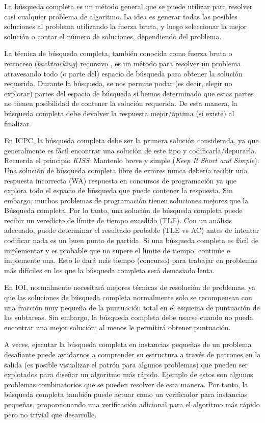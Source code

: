 La búsqueda completa es un método general que se puede utilizar para resolver casi cualquier problema de algoritmo. La idea es generar todas las posibles soluciones al problema utilizando la fuerza bruta, y luego seleccionar la mejor solución o contar el número de soluciones, dependiendo del problema.

La técnica de búsqueda completa, también conocida como fuerza bruta o retroceso (\emph{backtracking}) recursivo , es un método para resolver un problema atravesando todo (o parte del) espacio de búsqueda para obtener la solución requerida. Durante la búsqueda, se nos permite podar (es decir, elegir no explorar) partes del espacio de búsqueda si hemos determinado que estas partes no tienen posibilidad de contener la solución requerida. De esta manera, la búsqueda completa debe devolver la respuesta mejor/óptima (si existe) al finalizar.

En ICPC, la búsqueda completa debe ser la primera solución considerada, ya que generalmente es fácil encontrar una solución de este tipo y codificarla/depurarla. Recuerda el principio \emph{KISS}: Mantenlo breve y simple (\emph{Keep It
Short and Simple}). Una solución de búsqueda completa libre de errores nunca debería recibir una respuesta incorrecta (WA) respuesta en concursos de programación ya que explora todo el espacio de búsqueda que puede contener la respuesta. Sin embargo, muchos problemas de programación tienen soluciones mejores que la Búsqueda completa. Por lo tanto, una solución de búsqueda completa puede recibir un veredicto de límite de tiempo excedido (TLE). Con un análisis adecuado, puede determinar el resultado probable (TLE vs AC) antes de intentar codificar nada 
es un buen punto de partida. Si una búsqueda completa es fácil de implementar y es probable que no supere el límite de tiempo, continúe e implemente una. Esto le dará más tiempo (concurso) para trabajar en problemas más difíciles en los que la búsqueda completa será demasiado lenta.

En IOI, normalmente necesitará mejores técnicas de resolución de problemas, ya que las soluciones de búsqueda completa normalmente solo se recompensan con una fracción muy pequeña de la puntuación total en el esquema de puntuación de las subtareas. Sin embargo, la búsqueda completa debe usarse cuando no pueda encontrar una mejor solución; al menos le permitirá obtener puntuación.

A veces, ejecutar la búsqueda completa en instancias pequeñas de un problema desafiante puede
ayudarnos a comprender su estructura a través de patrones en la salida (es posible visualizar
el patrón para algunos problemas) que pueden ser explotados para diseñar un algoritmo más rápido. Ejemplo de estos son algunos problemas combinatorios que se pueden resolver de esta manera. Por tanto, la búsqueda completa también puede actuar como un verificador para instancias pequeñas, proporcionando una verificación adicional para el algoritmo más rápido pero no trivial que desarrolle.

